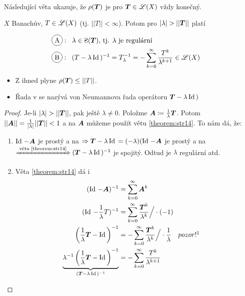 Následující věta ukazuje, že $\rho(\boldsymbol{T})$ je pro $\boldsymbol{T} \in \mathscr{L}(X)$ vždy konečný.
\begin{theorem}
\label{theorem:str26}
    $X$ Banachův, $T\in \mathscr{L}(X)$ (tj. $||T||<\infty$). Potom pro $|\lambda|>||\map T||$ platí

\begin{align*}
        &\circled{A}:\;\; \lambda \in \Sp(\map T)\text{, tj. } \lambda \text{ je regulární}  \\
        &\circled{B}:\;\; (T-\lambda\Id)^{-1}=T_\lambda^{-1}=-\sum\limits_{k=0}^\infty\frac{T^k}{\lambda^{k+1}}\in\lin(X) 
\end{align*}
\end{theorem}

\Poznamka \begin{itemize}
    \item Z  ihned plyne $\rho(\boldsymbol{T}) \leq ||T||$.
    \item Řada v  se nazývá von Neumannova řada operátoru $\boldsymbol{T}-\lambda \operatorname{Id}\,)$
\end{itemize}
\begin{proof}
    Je-li $|\lambda|>||\map T||$, pak ještě $\lambda\neq0$. Položme $\boldsymbol{A}\coloneqq\frac{1}{\lambda}\boldsymbol{T}$. Potom $||\boldsymbol{A}||=\frac{1}{|\lambda|}||\boldsymbol{T}||<1$ a na $\boldsymbol{A}$ můžeme použít větu \ref{theorem:str14}. To nám dá, že:
    \begin{enumerate}[label*=.]
        \item[\circled{A}] $\operatorname{Id}\,-\boldsymbol{A}$ je prostý a na $\Rightarrow \boldsymbol{T}-\lambda\operatorname{Id}\,=(-\lambda)(\operatorname{Id}\,-\boldsymbol{A}$ je prostý a na $\xRightarrow{\text{ věta \ref{theorem:str14}}} (\boldsymbol{T}-\lambda\operatorname{Id}\, )^{-1}$ je spojitý. Odtud je $\lambda$ regulární atd.
        \item[\circled{B}] Věta \ref{theorem:str14} dá i 
        \begin{align*}
            (\Id-\map A)^{-1}&=\sum_{k=0}^\infty \map A^k\\
            (\Id-\frac{1}{\lambda} T)^{-1}&=\sum_{k=0}^\infty\frac{\map T^k}{\lambda^k} \Big/ \cdot (-1)\\
            \left(\frac{1}{\lambda}\map T-\Id \right)^{-1}&=-\sum_{k=0}^\infty\frac{\map T^k}{\lambda^k} \Big/\cdot \frac{1}{\lambda} \quad pozor!\footnotemark\\
            \underbrace{\lambda^{-1}\left(\frac{1}{\lambda}\map T-\Id \right)^{-1}}_{(\map T-\lambda \Id)^{-1}}&=-\sum_{k=0}^\infty\frac{T^k}{\lambda^{k+1}}
        \end{align*}
      \end{enumerate}
\end{proof}

